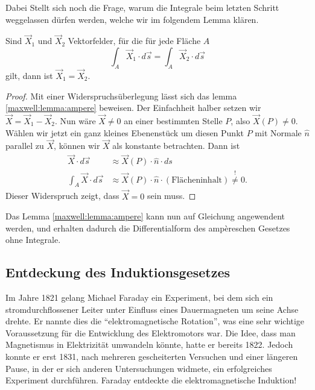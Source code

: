 Dabei Stellt sich noch die Frage, warum die Integrale beim letzten Schritt weggelassen dürfen werden, welche wir im folgendem Lemma klären.
\begin{lemma}
	\label{maxwell:lemma:ampere}
	Sind $\vec{X}_1$ und $\vec{X}_2$ Vektorfelder, für die für jede Fläche $A$
	\[
	\int_A \vec{X}_1\cdot d\vec{s}
	=
	\int_A \vec{X}_2\cdot d\vec{s}
	\]
	gilt, dann ist $\vec{X}_1=\vec{X}_2$.
\end{lemma}

\begin{proof}
	\label{maxwell:proof:ampere}
	Mit einer Widerspruchsüberlegung lässt sich das lemma \ref{maxwell:lemma:ampere} beweisen.
	Der Einfachheit halber setzen wir $\vec{X} = \vec{X}_1-\vec{X}_2$.
	Nun wäre $\vec{X} \ne 0$ an einer bestimmten Stelle $P$, also $\vec{X}(P) \ne 0$.
	Wählen wir jetzt ein ganz kleines Ebenenstück um diesen Punkt $P$ mit Normale $\hat{n}$ parallel zu $\vec{X}$, können wir $\vec{X}$ als konstante betrachten. 
	Dann ist
	\begin{align*}
		\vec{X} \cdot d\vec{s} 
		&\approx
		\vec{X}(P) \cdot \hat{n} \cdot ds
		\\
		\int_{A} \vec{X} \cdot d\vec{s}
		&\approx
		\vec{X}(P) \cdot \hat{n} \cdot (\text{Flächeninhalt}) \overset{!}{\ne} 0.
	\end{align*}
	Dieser Widerspruch zeigt, dass $\vec{X} = 0$ sein muss.
\end{proof}
Das Lemma \ref{maxwell:lemma:ampere} kann nun auf Gleichung  angewendent werden, und erhalten dadurch die Differentialform des ampèreschen Gesetzes ohne Integrale.


\subsection{Entdeckung des Induktionsgesetzes}

Im Jahre 1821 gelang Michael Faraday ein Experiment, bei dem sich ein stromdurchflossener Leiter unter Einfluss eines Dauermagneten um seine Achse drehte.
Er nannte dies die ``elektromagnetische Rotation'', was eine sehr wichtige Voraussetzung für die Entwicklung des Elektromotors war.
Die Idee, dass man Magnetismus in Elektrizität umwandeln könnte, hatte er bereits 1822.
Jedoch konnte er erst 1831, nach mehreren gescheiterten Versuchen und einer längeren Pause, in der er sich anderen Untersuchungen widmete, ein erfolgreiches Experiment durchführen.
Faraday entdeckte die elektromagnetische Induktion!

